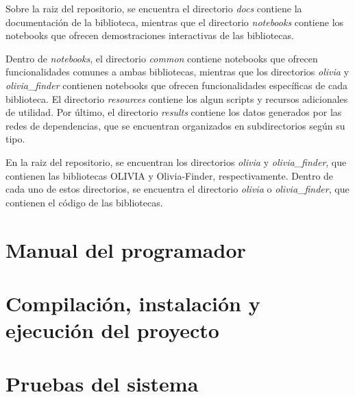Sobre la raiz del repositorio, se encuentra el directorio \textit{docs} contiene la documentación de la biblioteca, mientras que el directorio \textit{notebooks}
contiene los notebooks que ofrecen demostraciones interactivas de las bibliotecas.

Dentro de \textit{notebooks}, el directorio \textit{common} contiene notebooks que ofrecen funcionalidades comunes
a ambas bibliotecas, mientras que los directorios \textit{olivia} y \textit{olivia\_finder} contienen notebooks
que ofrecen funcionalidades específicas de cada biblioteca. 
El directorio \textit{resources} contiene los algun scripts
y recursos adicionales de utilidad. Por último, el directorio \textit{results} contiene los datos generados por las
redes de dependencias, que se encuentran organizados en subdirectorios según su tipo.

En la raiz del repositorio, se encuentran los directorios \textit{olivia} y \textit{olivia\_finder}, que contienen
las bibliotecas OLIVIA y Olivia-Finder, respectivamente. Dentro de cada uno de estos directorios, se encuentra 
el directorio \textit{olivia} o \textit{olivia\_finder}, que contienen el código de las bibliotecas.


\section{Manual del programador}

\section{Compilación, instalación y ejecución del proyecto}

\section{Pruebas del sistema}
